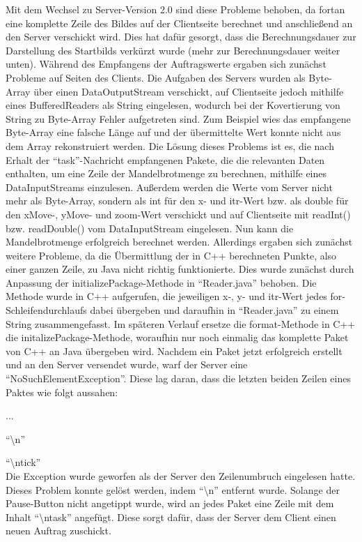 \documentclass[12pt, onecolumn, notitlepage]{scrartcl}
\begin{document}
Mit dem Wechsel zu Server-Version 2.0 sind diese Probleme behoben, da fortan eine komplette Zeile des Bildes auf der Clientseite berechnet und anschließend an den Server verschickt wird. Dies hat dafür gesorgt, dass die Berechnungsdauer zur Darstellung des Startbilds verkürzt wurde (mehr zur Berechnungsdauer weiter unten). Während des Empfangens der Auftragswerte ergaben sich zunächst Probleme auf Seiten des Clients. Die Aufgaben des Servers wurden als Byte-Array über einen DataOutputStream verschickt, auf Clientseite jedoch mithilfe eines BufferedReaders als String eingelesen, wodurch bei der Kovertierung von String zu Byte-Array Fehler aufgetreten sind. Zum Beispiel wies das empfangene Byte-Array eine falsche Länge auf und der übermittelte Wert konnte nicht aus dem Array rekonstruiert werden. Die Lösung dieses Problems ist es, die nach Erhalt der \enquote{task}-Nachricht empfangenen Pakete, die die relevanten Daten enthalten, um eine Zeile der Mandelbrotmenge zu berechnen, mithilfe eines DataInputStreams einzulesen. Außerdem werden die Werte vom Server nicht mehr als Byte-Array, sondern als int für den x- und itr-Wert bzw. als double für den xMove-, yMove- und zoom-Wert verschickt und auf Clientseite mit readInt() bzw. readDouble() vom DataInputStream eingelesen. Nun kann die Mandelbrotmenge erfolgreich berechnet werden. Allerdings ergaben sich zunächst weitere Probleme, da die Übermittlung der in C++ berechneten Punkte, also einer ganzen Zeile, zu Java nicht richtig funktionierte. Dies wurde zunächst durch Anpassung der initializePackage-Methode in \enquote{Reader.java} behoben. Die Methode wurde in C++ aufgerufen, die jeweiligen x-, y- und itr-Wert jedes for-Schleifendurchlaufs dabei übergeben und daraufhin in \enquote{Reader.java} zu einem String zusammengefasst. Im späteren Verlauf ersetze die format-Methode in C++ die initalizePackage-Methode, woraufhin nur noch einmalig das komplette Paket von C++ an Java übergeben wird. Nachdem ein Paket jetzt erfolgreich erstellt und an den Server versendet wurde, warf der Server eine \enquote{NoSuchElementException}. Diese lag daran, dass die letzten beiden Zeilen eines Paktes wie folgt aussahen: \par
... \par
\enquote{\textbackslash n} \par
\enquote{\textbackslash ntick} \\
Die Exception wurde geworfen als der Server den Zeilenumbruch eingelesen hatte. Dieses Problem konnte gelöst werden, 
indem \enquote{\textbackslash n} entfernt wurde. Solange der Pause-Button nicht angetippt wurde, wird an jedes Paket eine Zeile mit dem Inhalt \enquote{\textbackslash ntask} angefügt. Diese sorgt dafür, dass der Server dem Client einen neuen Auftrag zuschickt. \par
\end{document}
